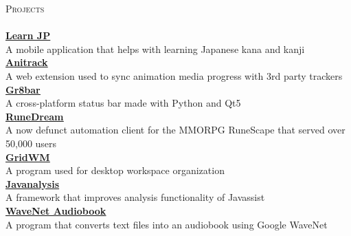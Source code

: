 \documentclass[a4paper]{article}
\newcommand{\lineunder} {
    \vspace*{-8pt} \\
    \hspace*{-18pt} \hrulefill \\
}
\newcommand{\header} [1] {
    {\hspace*{-18pt}\vspace*{6pt} \textsc{#1}}
    \vspace*{-6pt} \lineunder
}
\begin{document}
\header{Projects}
{\textbf{\href{https://itunes.apple.com/us/app/learn-jp/id1447060691}{\ul{Learn JP}}}}\\
\vspace*{1mm}
A mobile application that helps with learning Japanese kana and kanji\\
\vspace*{2mm}
{\textbf{\href{https://github.com/TSedlar/anitrack}{\ul{Anitrack}}}}\\
\vspace*{1mm}
A web extension used to sync animation media progress with 3rd party trackers\\
\vspace*{2mm}
{\textbf{\href{https://github.com/TSedlar/gr8bar}{\ul{Gr8bar}}}}\\
\vspace*{1mm}
A cross-platform status bar made with Python and Qt5\\
\vspace*{2mm}
{\textbf{\href{https://github.com/FThompson/RuneDream-API}{\ul{RuneDream}}}}\\
\vspace*{1mm}
A now defunct automation client for the MMORPG RuneScape that served over 50,000 users\\
\vspace*{2mm}
{\textbf{\href{https://github.com/TSedlar/GridWM}{\ul{GridWM}}}}\\
\vspace*{1mm}
A program used for desktop workspace organization\\
\vspace*{2mm}
{\textbf{\href{https://github.com/disassemble-io/javanalysis}{\ul{Javanalysis}}}}\\
\vspace*{1mm}
A framework that improves analysis functionality of Javassist\\
\vspace*{2mm}
{\textbf{\href{https://github.com/TSedlar/wavenet-audiobook}{\ul{WaveNet Audiobook}}}}\\
\vspace*{1mm}
A program that converts text files into an audiobook using Google WaveNet\\
\vspace*{2mm}
\end{document}
